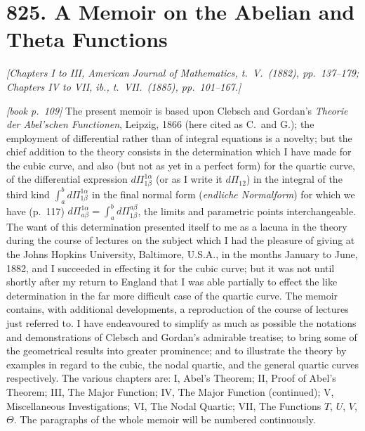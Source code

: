 \documentclass[11pt,a4paper]{article}
\theoremstyle{plain}
\theoremstyle{definition}
\theoremstyle{remark}
\begin{document}
\section*{825. A Memoir on the Abelian and Theta Functions}

\begin{center}
\textit{[Chapters I to III, American Journal of Mathematics, t.\ V.\ (1882), pp.\ 137--179;\\
Chapters IV to VII, ib., t.\ VII.\ (1885), pp.\ 101--167.]}
\end{center}

\noindent\textit{[book p.~109]} The present memoir is based upon Clebsch and Gordan's \textit{Theorie der Abel'schen Functionen}, Leipzig, 1866 (here cited as C.\ and G.); the employment of differential rather than of integral equations is a novelty; but the chief addition to the theory consists in the determination which I have made for the cubic curve, and also (but not as yet in a perfect form) for the quartic curve, of the differential expression $d\Pi_{1\beta}^{1\alpha}$ (or as I write it $d\Pi_{12}$) in the integral of the third kind $\int_a^b d\Pi_{1\beta}^{1\alpha}$ in the final normal form (\textit{endliche Normalform}) for which we have (p.~117) $d\Pi_{a\beta}^{1\alpha} = \int_a^b d\Pi_{1\beta}^{a\beta}$, the limits and parametric points interchangeable. The want of this determination presented itself to me as a lacuna in the theory during the course of lectures on the subject which I had the pleasure of giving at the Johns Hopkins University, Baltimore, U.S.A., in the months January to June, 1882, and I succeeded in effecting it for the cubic curve; but it was not until shortly after my return to England that I was able partially to effect the like determination in the far more difficult case of the quartic curve. The memoir contains, with additional developments, a reproduction of the course of lectures just referred to. I have endeavoured to simplify as much as possible the notations and demonstrations of Clebsch and Gordan's admirable treatise; to bring some of the geometrical results into greater prominence; and to illustrate the theory by examples in regard to the cubic, the nodal quartic, and the general quartic curves respectively. The various chapters are: I, Abel's Theorem; II, Proof of Abel's Theorem; III, The Major Function; IV, The Major Function (continued); V, Miscellaneous Investigations; VI, The Nodal Quartic; VII, The Functions $T$, $U$, $V$, $\Theta$. The paragraphs of the whole memoir will be numbered continuously.
\end{document}
